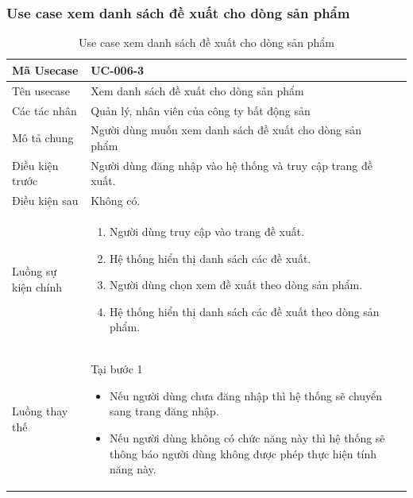 \documentclass[12pt,a4paper]{article}
\begin{document}
    \subsubsection*{Use case xem danh sách đề xuất cho dòng sản phẩm}
    \begin{table}[H]
        \centering
        \begin{tabular}{|p{3.5cm}|p{11.5cm}|c|}
            \hline
            Mã Usecase      & UC-006-3                                                     \\
            \hline
            Tên usecase     & Xem danh sách đề xuất cho dòng sản phẩm                      \\
            \hline
            Các tác nhân    & Quản lý, nhân viên của công ty bất động sản                  \\
            \hline
            Mô tả chung     & Người dùng muốn xem danh sách đề xuất cho dòng sản phẩm      \\
            \hline

            Điều kiện trước & Người dùng đăng nhập vào hệ thống và truy cập trang đề xuất. \\
            \hline

            Điều kiện sau   & Không có.                                                    \\
            \hline

            Luồng sự kiện chính & \vspace{-.8cm}\begin{enumerate}
                                                    \item Người dùng truy cập vào trang đề xuất.
                                                    \item Hệ thống hiển thị danh sách các đề xuất.
                                                    \item Người dùng chọn xem đề xuất theo dòng sản phẩm.
                                                    \item Hệ thống hiển thị danh sách các đề xuất theo dòng sản phẩm.
            \end{enumerate}
            \\
            \hline
            Luồng thay thế & Tại bước 1\newline
            \vspace{-.8cm}\begin{itemize}
                              \item Nếu người dùng chưa đăng nhập thì hệ thống sẽ chuyển sang trang đăng nhập.
                              \item Nếu người dùng không có chức năng này thì hệ thống sẽ thông báo người dùng không được phép thực hiện tính năng này.
            \end{itemize}
            \\ \hline
        \end{tabular}
        \caption{Use case xem danh sách đề xuất cho dòng sản phẩm}

    \end{table}
\end{document}
